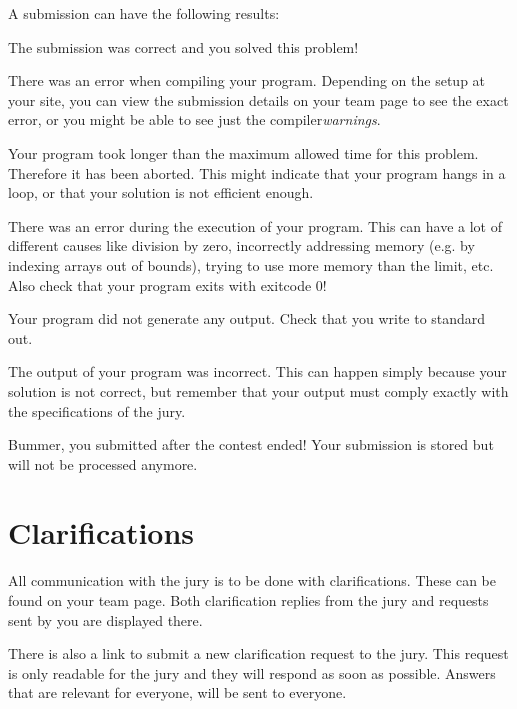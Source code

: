 A submission can have the following results:

\begin{description}[\setleftmargin{4.5cm}]
\item[CORRECT]
The submission was correct and you solved this problem!

\item[COMPILER-ERROR]
There was an error when compiling your program. Depending on the setup
at your site, you can view the submission details on your team page to
see the exact error, or you might be able to see just the
compiler\emph{warnings}.

\item[TIMELIMIT]
Your program took longer than the maximum allowed time for this
problem. Therefore it has been aborted. This might indicate that your
program hangs in a loop, or that your solution is not efficient
enough.

\item[RUN-ERROR]
There was an error during the execution of your program. This can have
a lot of different causes like division by zero, incorrectly
addressing memory (e.g. by indexing arrays out of bounds), trying to
use more memory than the limit, etc. 
Also check that your program exits with exitcode 0!

\item[NO-OUTPUT]
Your program did not generate any output. Check that you write to
standard out.

\item[WRONG-ANSWER]
The output of your program was incorrect. This can happen simply
because your solution is not correct, but remember that your output
must comply exactly with the specifications of the jury.

\item[TOO-LATE]
Bummer, you submitted after the contest ended! Your submission is stored but
will not be processed anymore.
\end{description}

\section{Clarifications}

All communication with the jury is to be done with clarifications.
These can be found on your team page. Both clarification replies from
the jury and requests sent by you are displayed there.

There is also a link to submit a new clarification request to the
jury. This request is only readable for the jury and they will respond
as soon as possible. Answers that are relevant for everyone, will be
sent to everyone.

